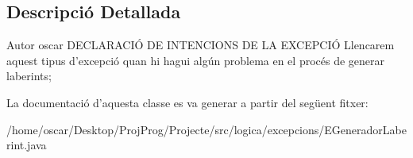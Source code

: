\subsection{Descripció Detallada}
\begin{DoxyAuthor}{Autor}
oscar D\+E\+C\+L\+A\+R\+A\+C\+IÓ D\+E I\+N\+T\+E\+N\+C\+I\+O\+N\+S D\+E L\+A E\+X\+C\+E\+P\+C\+IÓ Llencarem aquest tipus d'excepció quan hi hagui algún problema en el procés de generar laberints; 
\end{DoxyAuthor}


La documentació d'aquesta classe es va generar a partir del següent fitxer\+:\begin{DoxyCompactItemize}
\item 
/home/oscar/\+Desktop/\+Proj\+Prog/\+Projecte/src/logica/excepcions/E\+Generador\+Laberint.\+java\end{DoxyCompactItemize}
